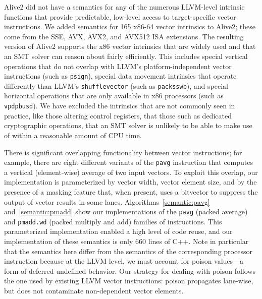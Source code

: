 Alive2 did not have a semantics for any of the numerous
LLVM-level intrinsic functions that provide predictable, low-level
access to target-specific vector instructions.
%
We added semantics for 165 x86-64 vector intrinsics to Alive2; these
come from the SSE, AVX, AVX2, and AVX512 ISA extensions.
%
The resulting version of Alive2 supports the x86 vector intrinsics
that are widely used and that an SMT solver can reason about fairly
efficiently.
%
This includes special vertical operations that do not overlap with
LLVM's platform-independent vector instructions (such as
\texttt{psign}), special data movement intrinsics that operate
differently than LLVM's \texttt{shufflevector} (such as
\texttt{packsswb}), and special horizontal operations that are only
available in x86 processors (such as \texttt{vpdpbusd}). We have
excluded the intrinsics that are not commonly seen in practice, like
those altering control registers, that those such as dedicated
cryptographic operations, that an SMT solver is unlikely to be able to
make use of within a reasonable amount of CPU time.


There is significant overlapping functionality between vector
instructions; for example, there are eight different variants of the
\texttt{pavg} instruction that computes a vertical (element-wise)
average of two input vectors.
%
To exploit this overlap, our implementation is parameterized by vector
width, vector element size, and by the presence of a masking feature
that, when present, uses a bitvector to suppress the output of vector
results in some lanes.
%
Algorithms~\ref{semantic:pavg} and~\ref{semantic:pmadd} show our
implementations of the \texttt{pavg} (packed average) and
\texttt{pmadd.wd} (packed multiply and add) families of instructions.
%
This parameterized implementation enabled a high level of code reuse,
and our implementation of these semantics is only 660 lines of C++.
%
Note in particular that the semantics here differ from the semantics of
the corresponding processor instruction because at the LLVM level, we
must account for poison values---a form of deferred undefined
behavior.
%
Our strategy for dealing with poison follows the one used by existing
LLVM vector instructions: poison propagates lane-wise, but does not
contaminate non-dependent vector elements.

